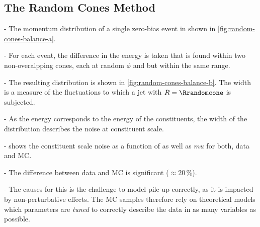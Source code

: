 



\subsection{The Random Cones Method}
\label{subsec:random-cones-method}
- The momentum distribution of a single zero-bias event in shown in \cref{fig:random-cones-balance-a}.

- For each event, the difference in the energy is taken that is found within two non-overalpping cones, each at random $\phi$ and \abseta but within the same \abseta range.

- The resulting distribution is shown in \cref{fig:random-cones-balance-b}. The width is a measure of the fluctuations to which a jet with $R = \Rrandomcone$ is subjected.

- As the energy corresponds to the energy of the constituents, the width of the distribution describes the noise at constituent scale.

-  shows the constituent scale noise as a function of \abseta as well as $mu$ for both, data and MC.

- The difference between data and MC is significant ($\approx 20\,\%$).

- The causes for this is the challenge to model pile-up correctly, as it is impacted by non-perturbative effects. The MC samples therefore rely on theoretical models which parameters are \emph{tuned} to correctly describe the data in as many variables as possible.

